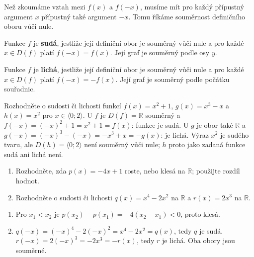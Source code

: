 \documentclass[11pt,a4paper]{article}
\begin{document}
Než zkoumáme vztah mezi $f(x)$ a $f(-x)$, musíme mít pro každý přípustný argument $x$ přípustný také argument $-x$. Tomu říkáme souměrnost definičního oboru vůči nule.
\begin{definiceBox}
Funkce $f$ je \textbf{sudá}, jestliže její definiční obor je souměrný vůči nule a pro každé $x\in D(f)$ platí $f(-x)=f(x)$. Její graf je souměrný podle osy $y$.
\end{definiceBox}
\begin{definiceBox}
Funkce $f$ je \textbf{lichá}, jestliže její definiční obor je souměrný vůči nule a pro každé $x\in D(f)$ platí $f(-x)=-f(x)$. Její graf je souměrný podle počátku souřadnic.
\end{definiceBox}
\begin{center}
\qquad
{}
\end{center}
\begin{prikladReseniBox}
Rozhodněte o sudosti či lichosti funkcí $f(x)=x^2+1$, $g(x)=x^3-x$ a $h(x)=x^2$ pro $x\in\langle0;2\rangle$.
\tcblower
U $f$ je $D(f)=\mathbb R$ souměrný a $f(-x)=(-x)^2+1=x^2+1=f(x)$: funkce je sudá. U $g$ je obor také $\mathbb R$ a $g(-x)=(-x)^3-(-x)=-x^3+x=-g(x)$: je lichá. Výraz $x^2$ je sudého tvaru, ale $D(h)=\langle0;2\rangle$ není souměrný vůči nule; $h$ proto jako zadaná funkce sudá ani lichá není.
\end{prikladReseniBox}
\begin{zadaniReseniBox}
\begin{enumerate}[label=\alph*)]
\item Rozhodněte, zda $p(x)=-4x+1$ roste, nebo klesá na $\mathbb R$; použijte rozdíl hodnot.
\item Rozhodněte o sudosti či lichosti $q(x)=x^4-2x^2$ na $\mathbb R$ a $r(x)=2x^3$ na $\mathbb R$.
\end{enumerate}
\tcblower
\begin{enumerate}[label=\alph*)]
\item Pro $x_1<x_2$ je $p(x_2)-p(x_1)=-4(x_2-x_1)<0$, proto klesá.
\item $q(-x)=(-x)^4-2(-x)^2=x^4-2x^2=q(x)$, tedy $q$ je sudá. $r(-x)=2(-x)^3=-2x^3=-r(x)$, tedy $r$ je lichá. Oba obory jsou souměrné.
\end{enumerate}
\end{zadaniReseniBox}
\end{document}
